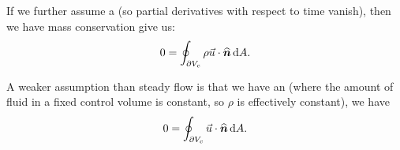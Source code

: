 \begin{node}\label{defn:steady-flow}
If we further assume a  (so partial derivatives
with respect to time vanish), then we have mass conservation give us:
\begin{equation}
0=\oint_{\partial V_{c}}\rho\vec{u}\cdot\widehat{\boldsymbol{n}}\,\mathrm{d} A.
\end{equation}
\end{node}

\begin{node}
A weaker assumption than steady flow is that we have an
 (where the amount of fluid in a fixed
control volume is constant, so $\rho$ is effectively constant), we have
\begin{equation}
0=\oint_{\partial V_{c}}\vec{u}\cdot\widehat{\boldsymbol{n}}\,\mathrm{d} A.
\end{equation}
\end{node}